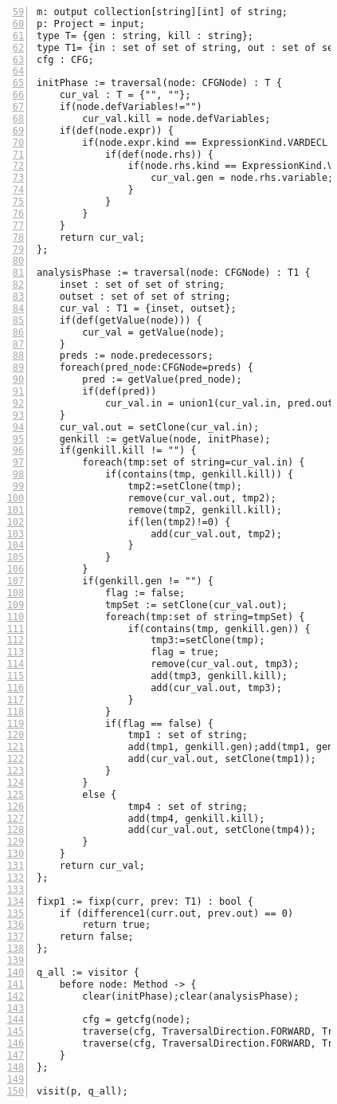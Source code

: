\begin{figure}[ht!]
\begin{lstlisting}[numbers=left, tabsize=4, escapechar=@, caption={Local may alias},label={lst:lma-code}, firstline = 59, firstnumber = 59] 
m: output collection[string][int] of string;
p: Project = input;
type T= {gen : string, kill : string};
type T1= {in : set of set of string, out : set of set of string};
cfg : CFG;

initPhase := traversal(node: CFGNode) : T {
	cur_val : T = {"", ""};
	if(node.defVariables!="")
		cur_val.kill = node.defVariables;
	if(def(node.expr)) {
		if(node.expr.kind == ExpressionKind.VARDECL || node.expr.kind == ExpressionKind.ASSIGN) {
			if(def(node.rhs)) {
				if(node.rhs.kind == ExpressionKind.VARACCESS) {
					cur_val.gen = node.rhs.variable;
				}
			}
		}
	}
	return cur_val;
};

analysisPhase := traversal(node: CFGNode) : T1 {
	inset : set of set of string;
	outset : set of set of string;
	cur_val : T1 = {inset, outset};
	if(def(getValue(node))) {
		cur_val = getValue(node);
	}	
	preds := node.predecessors;
	foreach(pred_node:CFGNode=preds) {	
		pred := getValue(pred_node);
		if(def(pred))
			cur_val.in = union1(cur_val.in, pred.out);
	}
	cur_val.out = setClone(cur_val.in);
	genkill := getValue(node, initPhase);
	if(genkill.kill != "") {
		foreach(tmp:set of string=cur_val.in) {
			if(contains(tmp, genkill.kill)) {
				tmp2:=setClone(tmp);
				remove(cur_val.out, tmp2);
				remove(tmp2, genkill.kill);
				if(len(tmp2)!=0) {
					add(cur_val.out, tmp2);
				}
			}
		}
		if(genkill.gen != "") {
			flag := false;
			tmpSet := setClone(cur_val.out);
			foreach(tmp:set of string=tmpSet) {
				if(contains(tmp, genkill.gen)) {
					tmp3:=setClone(tmp);
					flag = true;
					remove(cur_val.out, tmp3);
					add(tmp3, genkill.kill);
					add(cur_val.out, tmp3);
				}
			}
			if(flag == false) {
				tmp1 : set of string;
				add(tmp1, genkill.gen);add(tmp1, genkill.kill);
				add(cur_val.out, setClone(tmp1));
			}
		}
		else {
				tmp4 : set of string;
				add(tmp4, genkill.kill);
				add(cur_val.out, setClone(tmp4));
		}
	}
	return cur_val;
};

fixp1 := fixp(curr, prev: T1) : bool {
	if (difference1(curr.out, prev.out) == 0)
		return true;	
	return false;
};

q_all := visitor {
	before node: Method -> {
		clear(initPhase);clear(analysisPhase);

		cfg = getcfg(node);
		traverse(cfg, TraversalDirection.FORWARD, TraversalKind.HYBRID, initPhase);
		traverse(cfg, TraversalDirection.FORWARD, TraversalKind.HYBRID, analysisPhase, fixp1);
	}
};

visit(p, q_all);
\end{lstlisting}
\end{figure}